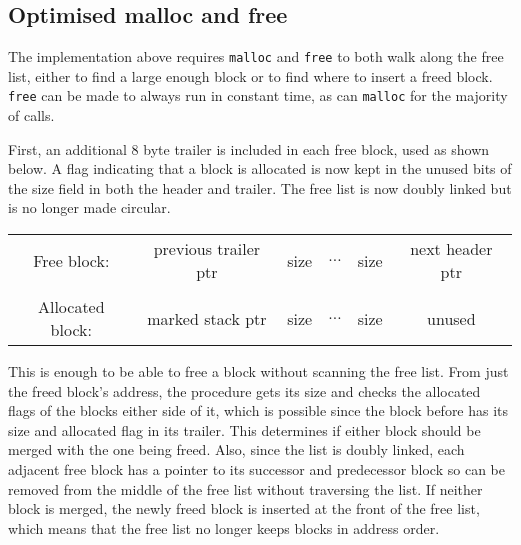 \subsection{Optimised malloc and free}
The implementation above requires \verb|malloc| and \verb|free| to both walk along the free list, either to find a large enough block or to find where to insert a freed block. \verb|free| can be made to always run in constant time, as can \verb|malloc| for the majority of calls.

First, an additional 8 byte trailer is included in each free block, used as shown below. A flag indicating that a block is allocated is now kept in the unused bits of the size field in both the header and trailer. The free list is now doubly linked but is no longer made circular. 


  \begin{tabular}{c|c|c|c|c|c|} \cline{2-6}
Free block: &  previous trailer ptr & size & $\dots$ & size & next header ptr \\ \cline{2-6} \multicolumn{1}{c}{}  \\ \cline{2-6}
Allocated block: &  marked stack ptr  & size & $\dots$ & size & unused \\ \cline{2-6}
\end{tabular}


This is enough to be able to free a block without scanning the free list. From just the freed block's address, the procedure gets its size and checks the allocated flags of the blocks either side of it, which is possible since the block before has its size and allocated flag in its trailer. This determines if either block should be merged with the one being freed. Also, since the list is doubly linked, each adjacent free block has a pointer to its successor and predecessor block so can be removed from the middle of the free list without traversing the list. If neither block is merged, the newly freed block is inserted at the front of the free list, which means that the free list no longer keeps blocks in address order.

